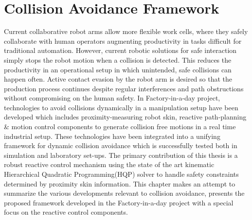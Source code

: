 \documentclass[a4paper,11pt,twoside]{StyleThese}
\begin{document}
\setcounter{chapter}{0} %
\fi

\chapter{Collision Avoidance Framework}
\label{chapter:framework}
Current collaborative robot arms allow more flexible work cells, where they safely collaborate with human operators augmenting productivity in tasks difficult for traditional automation. However, current robotic solutions for safe interaction simply stops the robot motion when a collision is detected. This reduces the productivity in an operational setup in which unintended, safe collisions can happen often. Active contact evasion by the robot arm is desired so that the production process continues despite regular interferences and path obstructions without compromising on the human safety. In Factory-in-a-day project, technologies to avoid collisions dynamically in a manipulation setup have been developed which includes proximity-measuring robot skin, reactive path-planning \& motion control components to generate collision free motions in a real time industrial setup. These technologies have been integrated into a unifying framework for dynamic collision avoidance which is successfully tested both in simulation and laboratory set-ups. The primary contribution of this thesis is a robust reactive control mechanism using the state of the art kinematic Hierarchical Quadratic Programming(HQP) solver to handle safety constraints determined by proximity skin information. This chapter makes an attempt to summarize the various developments relevant to collision avoidance, presents the proposed framework developed in the Factory-in-a-day project with a special focus on the reactive control components.







\ifdefined{}
\else


\end{document}
